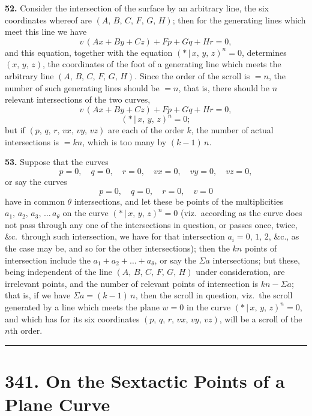 \documentclass[11pt,a4paper]{article}
\providecommand{\mid}{\,|\,}
\begin{document}
\medskip

\textbf{52.} Consider the intersection of the surface by an arbitrary line, the six coordinates whereof are $(A,\,B,\,C,\,F,\,G,\,H)$; then for the generating lines which meet this line we have
\[
v\,(Ax + By + Cz) + Fp + Gq + Hr = 0,
\]
and this equation, together with the equation $(*\mid x,\,y,\,z)^{n} = 0$, determines $(x,\,y,\,z)$, the coordinates of the foot of a generating line which meets the arbitrary line $(A,\,B,\,C,\,F,\,G,\,H)$. Since the order of the scroll is $= n$, the number of such generating lines should be $= n$, that is, there should be $n$ relevant intersections of the two curves,
\[
v\,(Ax + By + Cz) + Fp + Gq + Hr = 0,
\]
\[
(*\mid x,\,y,\,z)^{n} = 0;
\]
but if $(p,\,q,\,r,\,vx,\,vy,\,vz)$ are each of the order $k$, the number of actual intersections is $= kn$, which is too many by $(k - 1)\,n$.

\medskip

\textbf{53.} Suppose that the curves
\[
p = 0,\quad q = 0,\quad r = 0,\quad vx = 0,\quad vy = 0,\quad vz = 0,
\]
or say the curves
\[
p = 0,\quad q = 0,\quad r = 0,\quad v = 0
\]
have in common $\theta$ intersections, and let these be points of the multiplicities $a_{1},\,a_{2},\,a_{3},\,\ldots\,a_{\theta}$ on the curve $(*\mid x,\,y,\,z)^{n} = 0$ (viz.\ according as the curve does not pass through any one of the intersections in question, or passes once, twice, \&c.\ through such intersection, we have for that intersection $a_{i} = 0,\,1,\,2$, \&c., as the case may be, and so for the other intersections); then the $kn$ points of intersection include the $a_{1} + a_{2} + \ldots + a_{\theta}$, or say the $\Sigma a$ intersections; but these, being independent of the line $(A,\,B,\,C,\,F,\,G,\,H)$ under consideration, are irrelevant points, and the number of relevant points of intersection is $kn - \Sigma a$; that is, if we have $\Sigma a = (k - 1)\,n$, then the scroll in question, viz.\ the scroll generated by a line which meets the plane $w = 0$ in the curve $(*\mid x,\,y,\,z)^{n} = 0$, and which has for its six coordinates $(p,\,q,\,r,\,vx,\,vy,\,vz)$, will be a scroll of the $n$th order.

\bigskip
\noindent\rule{\textwidth}{0.4pt}
\bigskip

\section*{341. On the Sextactic Points of a Plane Curve}
\end{document}
